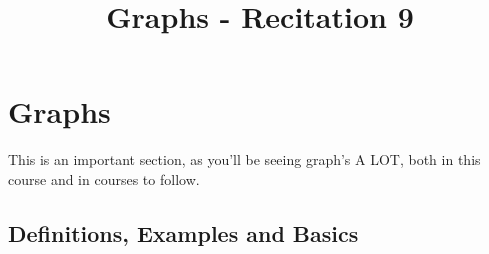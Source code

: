 \title{Graphs  - Recitation 9} 

\usetikzlibrary{positioning, arrows}

\iffalse
\newtheorem{prop}{Proposition}
\newtheorem{ex}{Exercise}
\newtheorem{sol}{Solution}
\newtheorem{theorem}{Theorem} \newtheorem{thm}{Theorem}[section]
\newtheorem{conj}[thm]{Conjecture} \newtheorem{lemma}[thm]{Lemma}
\newtheorem{corollary}[thm]{Corollary} \newtheorem{claim}[thm]{Claim}
\newtheorem{proposition}[thm]{Proposition}
\newtheorem{definition}{Definition} \newtheorem{remark}{Remark}
   
\pagestyle{empty}

\setlength{\textwidth}{6.5in}
\setlength{\evensidemargin}{0.0in}
\setlength{\oddsidemargin}{0.0in}
\setlength{\topmargin}{-0.25in}
\setlength{\textheight}{9.0in}
\setlength{\baselineskip}{1.3\baselineskip}
\setlength{\parindent}{.0in}
\fi
{}

\def\LinkedList#1{%
  \foreach \element in \list {
     \node[node of list, right = of aux, name=ele] {\element};
     \draw[link] (aux) -- (ele);
     \coordinate (aux) at (ele.east);
  } 
}





\vspace{0.2in}


\vspace{0.2in}

\section{Graphs}
This is an important section, as you'll be seeing graph's A LOT, both in this course and in courses to follow. 

\subsection{Definitions, Examples and Basics}

